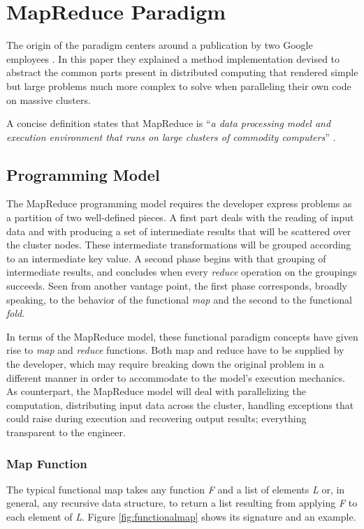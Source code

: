 \section{MapReduce Paradigm}\label{sec:mapred}
\noindent The origin of the paradigm centers around a publication by two Google employees \cite{googlemapreduce}. In this paper they explained a method implementation devised to abstract the common parts present in distributed computing that rendered simple but large problems much more complex to solve when paralleling their own code on massive clusters.

A concise definition states that MapReduce is ``\emph{a data processing model and execution environment that runs on large clusters of commodity computers}'' \cite{hadoopdefguide}.

\subsection{Programming Model}\label{subsec:programacionmapred}
\noindent The MapReduce programming model requires the developer express problems as a partition of two well-defined pieces. A first part deals with the reading of input data and with producing a set of intermediate results that will be scattered over the cluster nodes. These intermediate transformations will be grouped according to an intermediate key value. A second phase begins with that grouping of intermediate results, and concludes when every \emph{reduce} operation on the groupings succeeds. Seen from another vantage point, the first phase corresponds, broadly speaking, to the behavior of the functional \emph{map} and the second to the functional \emph{fold}.

In terms of the MapReduce model, these functional paradigm concepts have given rise to \emph{map} and \emph{reduce} functions. Both map and reduce have to be supplied by the developer, which may require breaking down the original problem in a different manner in order to accommodate to the model's execution mechanics. As counterpart, the MapReduce model will deal with parallelizing the computation, distributing input data across the cluster, handling exceptions that could raise during execution and recovering output results; everything transparent to the engineer.

\subsubsection{Map Function}\label{map}
\noindent The typical functional map takes any function \emph{F} and a list of elements \emph{L} or, in general, any recursive data structure, to return a list resulting from applying \emph{F} to each element of \emph{L}. Figure \ref{fig:functionalmap} shows its signature and an example.

